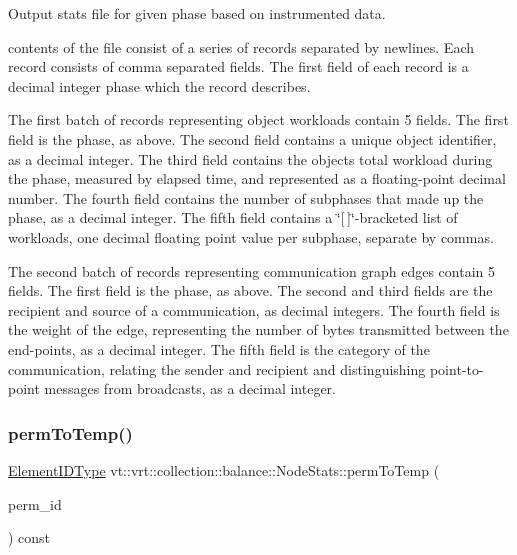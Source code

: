 Output stats file for given phase based on instrumented data. 

contents of the file consist of a series of records separated by newlines. Each record consists of comma separated fields. The first field of each record is a decimal integer phase which the record describes.

The first batch of records representing object workloads contain 5 fields. The first field is the phase, as above. The second field contains a unique object identifier, as a decimal integer. The third field contains the object\textquotesingle{}s total workload during the phase, measured by elapsed time, and represented as a floating-\/point decimal number. The fourth field contains the number of subphases that made up the phase, as a decimal integer. The fifth field contains a \char`\"{}\mbox{[}$\,$\mbox{]}\char`\"{}-\/bracketed list of workloads, one decimal floating point value per subphase, separate by commas.

The second batch of records representing communication graph edges contain 5 fields. The first field is the phase, as above. The second and third fields are the recipient and source of a communication, as decimal integers. The fourth field is the weight of the edge, representing the number of bytes transmitted between the end-\/points, as a decimal integer. The fifth field is the category of the communication, relating the sender and recipient and distinguishing point-\/to-\/point messages from broadcasts, as a decimal integer. \mbox{\label{structvt_1_1vrt_1_1collection_1_1balance_1_1_node_stats_a6e13d373b5365771b1f08fc0bd5c0bda}} 
\subsubsection{\texorpdfstring{perm\+To\+Temp()}{permToTemp()}}
{\footnotesize\ttfamily \hyperlink{namespacevt_1_1vrt_1_1collection_1_1balance_a14c8d2c972f2913aa3f1636e5be0a120}{Element\+I\+D\+Type} vt\+::vrt\+::collection\+::balance\+::\+Node\+Stats\+::perm\+To\+Temp (\begin{DoxyParamCaption}\item[{\hyperlink{namespacevt_1_1vrt_1_1collection_1_1balance_a14c8d2c972f2913aa3f1636e5be0a120}{Element\+I\+D\+Type}}]{perm\+\_\+id }\end{DoxyParamCaption}) const}



